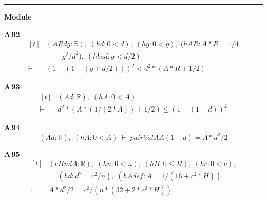 \vspace{4pt}\noindent\rule{\columnwidth}{0.4pt}\par\vspace{2pt}
\noindent\textbf{Module }\par\vspace{3pt}

\noindent\textbf{A\,92}\quad{}
{\footnotesize\[ \begin{aligned}[t]
&(\mathit{A} \mathit{R} \mathit{d} \mathit{g} : \mathbb{R} ),\; (\mathit{hd} : 0 < \mathit{d}),\; (\mathit{hg} : 0 < \mathit{g}),\; (\mathit{hAR} : \mathit{A} * \mathit{R} = 1 / 4\\
&\quad + \mathit{g} ^{2} / \mathit{d} ^{2}),\; (\mathit{hbad} : \mathit{g} < \mathit{d} / 2)\\
\vdash\;&(1 - (1 - (\mathit{g} + \mathit{d} / 2))) ^{2} < \mathit{d} ^{2} * (\mathit{A} * \mathit{R} + 1 / 2)
\end{aligned} \]}

\noindent\textbf{A\,93}\quad{}
{\footnotesize\[ \begin{aligned}[t]
&(\mathit{A} \mathit{d} : \mathbb{R} ),\; (\mathit{hA} : 0 < \mathit{A})\\
\vdash\;&\mathit{d} ^{2} * (\mathit{A} * (1 / (2 * \mathit{A})) + 1 / 2) \leq (1 - (1 - \mathit{d})) ^{2}
\end{aligned} \]}

\noindent\textbf{A\,94}\quad{}
{\footnotesize\[ (\mathit{A} \mathit{d} : \mathbb{R} ),\; (\mathit{hA} : 0 < \mathit{A}) \;\vdash\; \mathit{pairVal} \mathit{A} \mathit{A} (1 - \mathit{d}) = \mathit{A} * \mathit{d} ^{2} / 2 \]}

\noindent\textbf{A\,95}\quad{}
{\footnotesize\[ \begin{aligned}[t]
&(\mathit{c} \mathit{H} \mathit{n} \mathit{d} \mathit{A} : \mathbb{R} ),\; (\mathit{hn} : 0 < \mathit{n}),\; (\mathit{hH} : 0 \leq \mathit{H}),\; (\mathit{hc} : 0 < \mathit{c}),\\
&\quad \; (\mathit{hd} : \mathit{d} ^{2} = \mathit{c} ^{2} / \mathit{n}),\; (\mathit{hAdef} : \mathit{A} = 1 / (16 + \mathit{c} ^{2} * \mathit{H}))\\
\vdash\;&\mathit{A} * \mathit{d} ^{2} / 2 = \mathit{c} ^{2} / (\mathit{n} * (32 + 2 * \mathit{c} ^{2} * \mathit{H}))
\end{aligned} \]}


